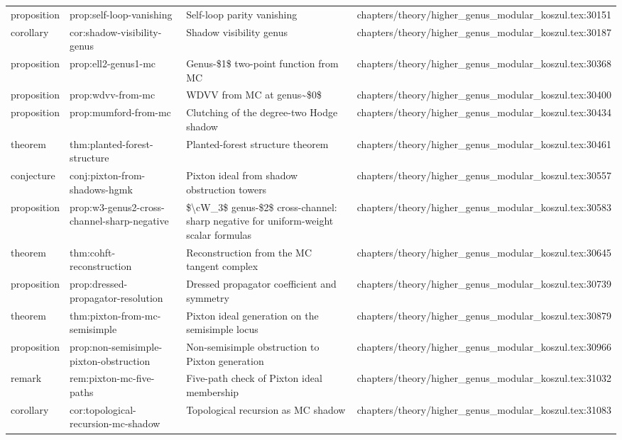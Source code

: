 \documentclass[11pt]{article}
\begin{document}
\begin{longtable}{L{0.10\textwidth}L{0.26\textwidth}L{0.42\textwidth}L{0.22\textwidth}}
proposition & prop:self-loop-vanishing & Self-loop parity vanishing & chapters/theory/higher\_genus\_modular\_koszul.tex:30151\\
corollary & cor:shadow-visibility-genus & Shadow visibility genus & chapters/theory/higher\_genus\_modular\_koszul.tex:30187\\
proposition & prop:ell2-genus1-mc & Genus-\$1\$ two-point function from MC & chapters/theory/higher\_genus\_modular\_koszul.tex:30368\\
proposition & prop:wdvv-from-mc & WDVV from MC at genus\textasciitilde{}\$0\$ & chapters/theory/higher\_genus\_modular\_koszul.tex:30400\\
proposition & prop:mumford-from-mc & Clutching of the degree-two Hodge shadow & chapters/theory/higher\_genus\_modular\_koszul.tex:30434\\
theorem & thm:planted-forest-structure & Planted-forest structure theorem & chapters/theory/higher\_genus\_modular\_koszul.tex:30461\\
conjecture & conj:pixton-from-shadows-hgmk & Pixton ideal from shadow obstruction towers & chapters/theory/higher\_genus\_modular\_koszul.tex:30557\\
proposition & prop:w3-genus2-cross-channel-sharp-negative & \$\textbackslash{}cW\_3\$ genus-\$2\$ cross-channel: sharp negative for uniform-weight scalar formulas & chapters/theory/higher\_genus\_modular\_koszul.tex:30583\\
theorem & thm:cohft-reconstruction & Reconstruction from the MC tangent complex & chapters/theory/higher\_genus\_modular\_koszul.tex:30645\\
proposition & prop:dressed-propagator-resolution & Dressed propagator coefficient and symmetry & chapters/theory/higher\_genus\_modular\_koszul.tex:30739\\
theorem & thm:pixton-from-mc-semisimple & Pixton ideal generation on the semisimple locus & chapters/theory/higher\_genus\_modular\_koszul.tex:30879\\
proposition & prop:non-semisimple-pixton-obstruction & Non-semisimple obstruction to Pixton generation & chapters/theory/higher\_genus\_modular\_koszul.tex:30966\\
remark & rem:pixton-mc-five-paths & Five-path check of Pixton ideal membership & chapters/theory/higher\_genus\_modular\_koszul.tex:31032\\
corollary & cor:topological-recursion-mc-shadow & Topological recursion as MC shadow & chapters/theory/higher\_genus\_modular\_koszul.tex:31083\\

\end{longtable}
\end{document}
